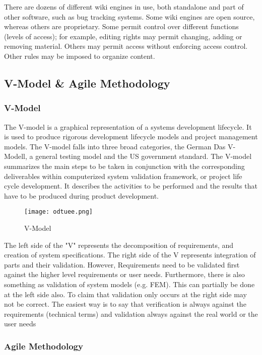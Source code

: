 There are dozens of different wiki engines in use, both standalone and part of other software, such as bug tracking systems. Some wiki engines are open source, whereas others are proprietary. Some permit control over different functions (levels of access); for example, editing rights may permit changing, adding or removing material. Others may permit access without enforcing access control. Other rules may be imposed to organize content.
\\

\subsection{V-Model \& Agile Methodology}
\-
\subsubsection{V-Model}
The V-model is a graphical representation of a systems development lifecycle. It is used to produce rigorous development lifecycle models and project management models. The V-model falls into three broad categories, the German Das V-Modell, a general testing model and the US government standard.
The V-model summarizes the main steps to be taken in conjunction with the corresponding deliverables within computerized system validation framework, or project life cycle development. It describes the activities to be performed and the results that have to be produced during product development.


\begin{figure}[H]
\texttt{[image: odtuee.png]}\\[1cm]
\caption{\label{fig:cooling}V-Model }
\end{figure}


The left side of the "V" represents the decomposition of requirements, and creation of system specifications. The right side of the V represents integration of parts and their validation. However, Requirements need to be validated first against the higher level requirements or user needs. Furthermore, there is also something as validation of system models (e.g. FEM). This can partially be done at the left side also. To claim that validation only occurs at the right side may not be correct. The easiest way is to say that verification is always against the requirements (technical terms) and validation always against the real world or the user needs




\subsubsection{Agile Methodology}

